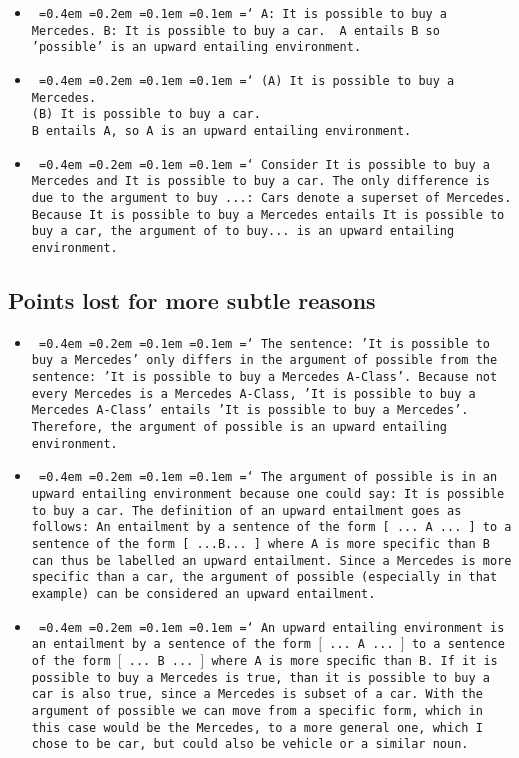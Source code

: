 \documentclass[a4,11pt]{article}
\newcommand*\justify{%
  \fontdimen2\font=0.4em%
  \fontdimen3\font=0.2em%
  \fontdimen4\font=0.1em%
  \fontdimen7\font=0.1em%
  \hyphenchar\font=`\-%
}
\begin{document}
\begin{itemize}[leftmargin = 12pt]
\item \texttt{\justify A: It is possible to buy a Mercedes.
\\ B: It is possible to buy a car. 
\\ A entails B so 'possible' is an upward entailing environment.}


\item \texttt{\justify (A) It is possible to buy a Mercedes. \\ (B) It is possible to buy a car.
\\ B entails A, so A is an upward entailing environment.}


\item \texttt{\justify Consider It is possible to buy a Mercedes and It is possible to buy a car. The only difference is due to the argument to buy ...: Cars denote a superset of Mercedes. Because It is possible to buy a Mercedes entails It is possible to buy a car, the argument of to buy... is an upward entailing environment.}

\end{itemize}


\subsection*{Points lost for more subtle reasons}

\begin{itemize}[leftmargin = 12pt]

\item \texttt{\justify The sentence: 'It is possible to buy a Mercedes' only differs in the argument of possible from the sentence: 'It is possible to buy a Mercedes A-Class'. Because not every Mercedes is a Mercedes A-Class, 'It is possible to buy a Mercedes A-Class' entails 'It is possible to buy a Mercedes'. Therefore, the argument of possible is an upward entailing environment.}

\item \texttt{\justify The argument of possible is in an upward entailing environment because one could say: It is possible to buy a car. The definition of an upward entailment goes as follows: An entailment by a sentence of the form [ ... A ... ] to a sentence of the form [ ...B... ] where A is more specific than B can thus be labelled an upward entailment. Since a Mercedes is more specific than a car, the argument of possible (especially in that example) can be considered an upward entailment.}

\item \texttt{\justify An upward entailing environment is an entailment by a sentence of the form $[$ ... A ... $]$ to a sentence of the form $[$ ... B ... $]$ where A is more speciﬁc than B. If it is possible to buy a Mercedes is true, than it is possible to buy a car is also true, since a Mercedes is subset of a car. With the argument of possible we can move from a specific form, which in this case would be the Mercedes, to a more general one, which I chose to be car, but could also be vehicle or a similar noun.}

\end{itemize}
\end{document}
